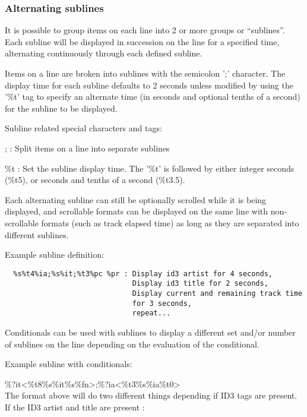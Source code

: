 \subsubsection{Alternating sublines}

It is possible to group items on each line into 2 or more groups or
``sublines''. Each subline will be displayed
in succession on the line for a specified time, alternating
continuously through each defined subline. 

Items on a line are broken into sublines with the semicolon
';' character. The display time for
each subline defaults to 2 seconds unless modified by using the
'\%t' tag to specify an alternate
time (in seconds and optional tenths of a second) for the subline to be
displayed. 

Subline related special characters and tags: 

;  : Split items on a line into separate sublines

\%t  : Set the subline display time. The
'\%t' is followed by either integer
seconds (\%t5), or seconds and tenths of a second (\%t3.5).

Each alternating subline can still be optionally scrolled while it is
being displayed, and scrollable formats can be displayed on the same
line with non{}-scrollable formats (such as track elapsed time) as long
as they are separated into different sublines.

Example subline definition:

\begin{verbatim}
  %s%t4%ia;%s%it;%t3%pc %pr : Display id3 artist for 4 seconds,
                              Display id3 title for 2 seconds,
                              Display current and remaining track time
                              for 3 seconds,
                              repeat...
\end{verbatim}

Conditionals can be used with sublines to display a different set and/or number of sublines on the line depending on the evaluation of the conditional.

Example subline with conditionals:

\%?it{\textless}\%t8\%s\%it{\textbar}\%s\%fn{\textgreater};\%?ia{\textless}\%t3\%s\%ia{\textbar}\%t0{\textgreater}\\

The format above will do two different things depending if ID3 tags are present. If the ID3 artist and title are present :

